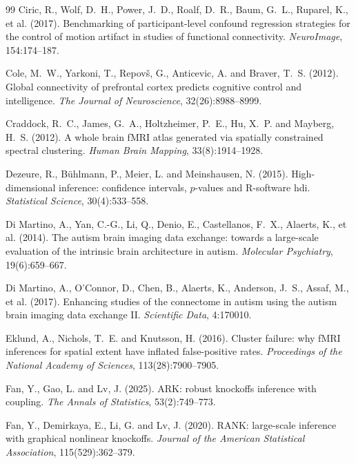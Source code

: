 \documentclass[11pt,a4paper]{article}
\begin{document}
\begin{thebibliography}{99}
Ciric, R., Wolf, D.~H., Power, J.~D., Roalf, D.~R., Baum, G.~L., Ruparel,
K., et al. (2017).
Benchmarking of participant-level confound regression strategies for the
control of motion artifact in studies of functional connectivity.
\emph{NeuroImage}, 154:174--187.

Cole, M.~W., Yarkoni, T., Repov\v{s}, G., Anticevic, A. and Braver, T.~S.
(2012).
Global connectivity of prefrontal cortex predicts cognitive control and
intelligence.
\emph{The Journal of Neuroscience}, 32(26):8988--8999.

Craddock, R.~C., James, G.~A., Holtzheimer, P.~E., Hu, X.~P. and Mayberg,
H.~S. (2012).
A whole brain fMRI atlas generated via spatially constrained spectral
clustering.
\emph{Human Brain Mapping}, 33(8):1914--1928.

Dezeure, R., B\"uhlmann, P., Meier, L. and Meinshausen, N. (2015).
High-dimensional inference: confidence intervals, $p$-values and R-software
hdi.
\emph{Statistical Science}, 30(4):533--558.

Di Martino, A., Yan, C.-G., Li, Q., Denio, E., Castellanos, F.~X., Alaerts,
K., et al. (2014).
The autism brain imaging data exchange: towards a large-scale evaluation of
the intrinsic brain architecture in autism.
\emph{Molecular Psychiatry}, 19(6):659--667.

Di Martino, A., O'Connor, D., Chen, B., Alaerts, K., Anderson, J.~S.,
Assaf, M., et al. (2017).
Enhancing studies of the connectome in autism using the autism brain imaging
data exchange II.
\emph{Scientific Data}, 4:170010.

Eklund, A., Nichols, T.~E. and Knutsson, H. (2016).
Cluster failure: why fMRI inferences for spatial extent have inflated
false-positive rates.
\emph{Proceedings of the National Academy of Sciences}, 113(28):7900--7905.

Fan, Y., Gao, L. and Lv, J. (2025).
ARK: robust knockoffs inference with coupling.
\emph{The Annals of Statistics}, 53(2):749--773.

Fan, Y., Demirkaya, E., Li, G. and Lv, J. (2020).
RANK: large-scale inference with graphical nonlinear knockoffs.
\emph{Journal of the American Statistical Association}, 115(529):362--379.


\end{thebibliography}
\end{document}
